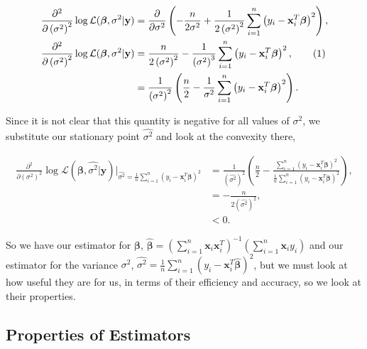 \documentclass[honours,12pt]{unswthesis}
\newcommand{\s}{\sum_{i=1}^{n}}
\newcommand\numberthis{\addtocounter{equation}{1}\tag{\theequation}}
\numberwithin{equation}{section}
\begin{document}
	\begin{align*}
	\frac{\partial^{2}}{\partial \left( \sigma^{2} \right)^{2}} \log\mathcal{L}(\bm{\beta},\sigma^{2} | \mathbf{y}) &= \frac{\partial}{\partial \sigma^{2}} \left( -\frac{n}{2\sigma^{2}} + \frac{1}{2\left( \sigma^{2}\right)^{2}}\s \left( y_{i} - \mathbf{x}_{i}^{T}\bm{\beta} \right)^{2} \right),\\
	\frac{\partial^{2}}{\partial \left( \sigma^{2} \right)^{2}} \log\mathcal{L}(\bm{\beta},\sigma^{2} | \mathbf{y}) &= \frac{n}{2\left( \sigma^{2} \right)^{2}} -\frac{1}{\left( \sigma^{2}\right)^{3}} \s \left( y_{i} - \mathbf{x}_{i}^{T} \bm{\beta}\right)^{2}, \numberthis \label{partialsig2}\\
	&= \frac{1}{\left( \sigma^{2}\right)^{2}}\left( \frac{n}{2} - \frac{1}{\sigma^{2}} \s \left( y_{i} - \mathbf{x}_{i}^{T} \bm{\beta}\right)^{2}\right).
\end{align*}

\noindent Since it is not clear that this quantity is negative for all values of $\sigma^{2}$, we substitute our stationary point $\widehat{\sigma^{2}}$ and look at the convexity there,

\begin{align*}
	\frac{\partial^{2}}{\partial \left( \sigma^{2} \right)^{2}} \log\mathcal{L}(\bm{\beta},\widehat{\sigma^{2}} | \mathbf{y}) \bigg\vert_{\widehat{\sigma^{2}} = \frac{1}{n} \s \left( y_{i} - \mathbf{x}_{i}^{T} \bm{\beta} \right)^{2}} &= \frac{1}{\left( \widehat{\sigma^{2}}\right)^{2}} \left( \frac{n}{2} - \frac{\s \left( y_{i} - \mathbf{x}_{i}^{T} \bm{\beta}\right)^{2}}{\frac{1}{n}\s \left( y_{i} - \mathbf{x}_{i}^{T}\bm{\beta} \right)^{2}} \right),\\
	&= -\frac{n}{2\left( \widehat{\sigma^{2}}\right)^{2}},\\
	&< 0.
\end{align*}

So we have our estimator for $\bm{\beta}$, $\hat{\bm{\beta}} =  \left( \s \mathbf{x}_{i} \mathbf{x}_{i}^{T} \right)^{-1} \left( \s \mathbf{x}_{i}y_{i} \right)$ and our estimator for the variance $\sigma^{2}$, $\widehat{\sigma^{2}} =  \frac{1}{n} \s \left( y_{i} - \mathbf{x}_{i}^{T}\hat{\bm{\beta}} \right)^{2}$, but we must look at how useful they are for us, in terms of their efficiency and accuracy, so we look at their properties.



\subsection{Properties of Estimators}
\end{document}

